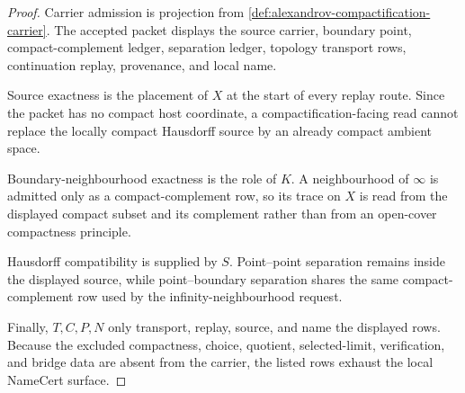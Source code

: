 \begin{proof}
Carrier admission is projection from \autoref{def:alexandrov-compactification-carrier}. The accepted packet displays the source carrier, boundary point, compact-complement ledger, separation ledger, topology transport rows, continuation replay, provenance, and local name.

Source exactness is the placement of $X$ at the start of every replay route. Since the packet has no compact host coordinate, a compactification-facing read cannot replace the locally compact Hausdorff source by an already compact ambient space.

Boundary-neighbourhood exactness is the role of $K$. A neighbourhood of $\infty$ is admitted only as a compact-complement row, so its trace on $X$ is read from the displayed compact subset and its complement rather than from an open-cover compactness principle.

Hausdorff compatibility is supplied by $S$. Point--point separation remains inside the displayed source, while point--boundary separation shares the same compact-complement row used by the infinity-neighbourhood request.

Finally, $T,C,P,N$ only transport, replay, source, and name the displayed rows. Because the excluded compactness, choice, quotient, selected-limit, verification, and bridge data are absent from the carrier, the listed rows exhaust the local NameCert surface.
\end{proof}

